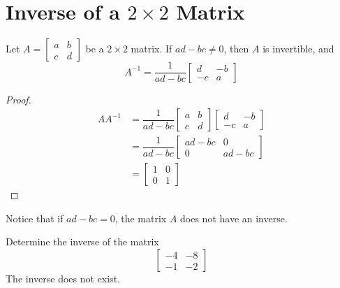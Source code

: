 \documentclass[letterpaper,12pt]{article}
\begin{document}
\section*{Inverse of a $2 \times 2$ Matrix}
\begin{theorem}
Let $A = \begin{bmatrix} a & b \\ c & d \end{bmatrix}$ be a $2 \times 2$ matrix. If $ad - bc \neq 0$, then $A$ is invertible, and
\begin{equation*}
    A^{-1} = \dfrac{1}{ad - bc} \begin{bmatrix} d & -b \\ -c & a \end{bmatrix}
\end{equation*}
\end{theorem}
\begin{proof}
\begin{align*}
    AA^{-1} & = \dfrac{1}{ad - bc} \begin{bmatrix} a & b \\ c & d \end{bmatrix} \begin{bmatrix} d & -b \\ -c & a \end{bmatrix} \\
    & = \dfrac{1}{ad - bc} \begin{bmatrix} ad - bc & 0 \\ 0 & ad - bc \end{bmatrix} \\
    & = \begin{bmatrix} 1 & 0 \\ 0 & 1 \end{bmatrix}
\end{align*}
\end{proof}

Notice that if $ad - bc = 0$, the matrix $A$ does not have an inverse.

\begin{example}
Determine the inverse of the matrix
\begin{equation*}
    \begin{bmatrix} -4 & -8 \\ -1 & -2 \end{bmatrix}
\end{equation*}
The inverse does not exist.
\end{example}
\end{document}
